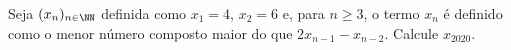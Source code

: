 Seja $(x_n)_{n\in\NN}$ definida como $x_1 = 4$, $x_2 = 6$ e, para $n \ge 3$, o termo $x_n$ é definido como o menor número composto maior do que $2x_{n-1} - x_{n-2}$. Calcule $x_{2020}$.
